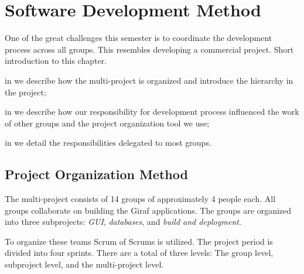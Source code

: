 \chapter{Software Development Method}\label{chap:sw_dev_method}

One of the great challenges this semester is to coordinate the development process across all groups. This resembles developing a commercial project. 
Short introduction to this chapter. \dummy~\dummy~\dummy~\dummy~\dummy~\dummy

\begin{chapterorganization}
  \item in  we describe how the multi-project is organized and introduce the hierarchy in the project;
  \item in  we describe how our responsibility for development process influenced the work of other groups and the project organization tool we use;
  \item in  we detail the responsibilities delegated to most groups.
\end{chapterorganization}

\section{Project Organization Method}\label{sec:project_overview}
The multi-project consists of 14 groups of approximately 4 people each. 
All groups collaborate on building the Giraf applications. The groups are organized into three subprojects: \emph{GUI}, \emph{databases}, and \emph{build and deployment}.

To organize these teams Scrum of Scrums  is utilized.  The project period is divided into four sprints. There are a total of three levels: The group level, subproject level, and the multi-project level.

